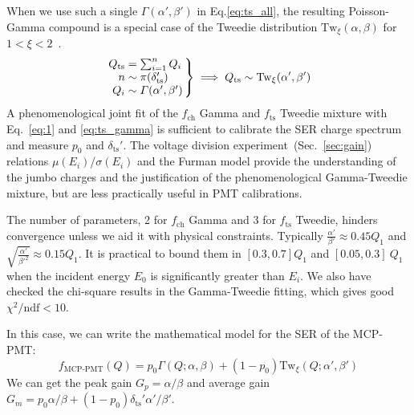 When we use such a single \(\varGamma(\alpha', \beta')\) in Eq.\eqref{eq:ts_all},
the resulting Poisson-Gamma compound is a special case of the Tweedie distribution $\mathrm{Tw}_{\xi}(\alpha,\beta)$
for $1<\xi<2$~\cite{1991Tweedie}.
\begin{equation}
	\arraycolsep=1.4pt
	\label{eq:ts_gamma}
	\left.\begin{array}{rl}
		Q_{\text{ts}} & = \sum_{{i}=1}^{n} Q_{i}                 \\
		n             & \sim \mathrm{\pi}(\delta_{\mathrm{ts}}') \\
		Q_{i}         & \sim \varGamma(\alpha', \beta')
	\end{array}\right\} \implies
	Q_{\text{ts}} \sim \mathrm{Tw}_{\xi}(\alpha',\beta')
\end{equation}
A phenomenological joint fit of the \(f_\mathrm{ch}\) Gamma and \(f_\mathrm{ts}\) Tweedie
mixture with Eq.~\eqref{eq:1} and \eqref{eq:ts_gamma} is sufficient to calibrate the SER charge spectrum and measure \(p_0\) and \(\delta_\text{ts}'\).
The voltage division experiment~(Sec.~\ref{sec:gain}) relations \(\mu(E_i)\)/\(\sigma(E_i)\) and the Furman model provide the understanding of the jumbo charges and the justification of the phenomenological Gamma-Tweedie
mixture, but are less practically useful in PMT calibrations.

The number of parameters, 2 for \(f_\mathrm{ch}\) Gamma and 3 for \(f_\mathrm{ts}\) Tweedie,
hinders convergence unless we aid it with physical constraints.
Typically $\frac{\alpha'}{\beta'}\approx 0.45Q_1$ and \(\sqrt{\frac{\alpha'}{\beta'^2}}\approx 0.15Q_1\).
It is practical to bound them in $[0.3,0.7]Q_1$ and $[0.05,0.3]~Q_1$ when the incident energy $E_0$ is significantly greater than $E_{i}$.
We also have checked the chi-square results in the Gamma-Tweedie fitting,
which gives good $\chi^2/\mathrm{ndf}<10$.

In this case, we can write the mathematical model for the SER of the MCP-PMT:
\begin{equation}
	\label{eq:GTmodel}
	f_{\text{MCP-PMT}}(Q) = p_0 \varGamma(Q; \alpha, \beta) + (1-p_0) \mathrm{Tw}_{\xi}(Q; \alpha', \beta')
\end{equation}
We can get the peak gain $G_p=\alpha/\beta$ and average gain $G_m=p_0\alpha/\beta+(1-p_0)\delta_{\mathrm{ts}}'\alpha'/\beta'$. 

